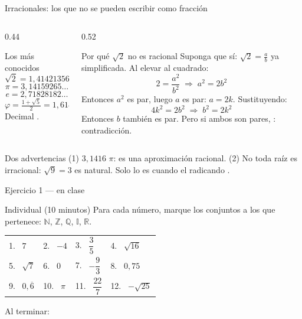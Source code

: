 \documentclass[aspectratio=169,10pt]{beamer}
\begin{document}
\begin{frame}{Irracionales: los que no se pueden escribir como fracción}
  \scriptsize
  \begin{columns}[T,onlytextwidth]
    \begin{column}{0.44\textwidth}
      \begin{block}{Los más conocidos}
        \tiny
        \[ \sqrt{2} = 1{,}41421356\dots \]
        \[ \pi = 3{,}14159265\dots \]
        \[ e = 2{,}71828182\dots \]
        \[ \varphi = \tfrac{1+\sqrt{5}}{2} = 1{,}61803398\dots \]
        Decimal .
      \end{block}
    \end{column}
    \begin{column}{0.52\textwidth}
      \begin{exampleblock}{Por qué $\sqrt{2}$ no es racional}
        \tiny
        Suponga que sí: $\sqrt{2} = \frac{a}{b}$ ya simplificada. Al elevar
        al cuadrado:
        \[ 2 = \frac{a^2}{b^2} \;\Rightarrow\; a^2 = 2b^2 \]
        Entonces $a^2$ es par, luego $a$ es par: $a = 2k$. Sustituyendo:
        \[ 4k^2 = 2b^2 \;\Rightarrow\; b^2 = 2k^2 \]
        Entonces $b$ también es par. Pero si ambos son pares,
        : contradicción.
      \end{exampleblock}
    \end{column}
  \end{columns}

  \vspace{0.02cm}
  \begin{alertblock}{Dos advertencias}
    \tiny
    (1) $3{,}1416$  $\pi$: es una aproximación racional. \quad
    (2) No toda raíz es irracional: $\sqrt{9} = 3$ es natural. Solo lo es
    cuando el radicando .
  \end{alertblock}
\end{frame}

\begin{frame}{Ejercicio 1 — en clase}
  \begin{alertblock}{Individual (10 minutos)}
    \scriptsize
    Para cada número, marque  los conjuntos a los que
    pertenece: $\mathbb{N}$, $\mathbb{Z}$, $\mathbb{Q}$, $\mathbb{I}$,
    $\mathbb{R}$.

    \vspace{0.25cm}
    \centering
    \begin{tabular}{@{}llll@{}}
      1. \ $7$ & 2. \ $-4$ & 3. \ $\dfrac{3}{5}$ & 4. \ $\sqrt{16}$ \\[0.6em]
      5. \ $\sqrt{7}$ & 6. \ $0$ & 7. \ $-\dfrac{9}{3}$ & 8. \ $0{,}75$ \\[0.6em]
      9. \ $0{,}\overline{6}$ & 10. \ $\pi$ & 11. \ $\dfrac{22}{7}$ &
      12. \ $-\sqrt{25}$ \\
    \end{tabular}

    \vspace{0.25cm}
    \raggedright
    Al terminar: 
  \end{alertblock}
\end{frame}
\end{document}
